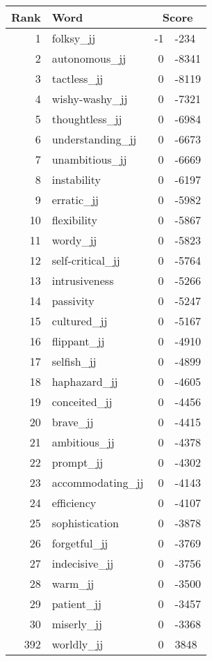 \begin{longtable}[!htbp]{| rlr@{.}l |}
    \hline
    \textbf{Rank} & \textbf{Word} & \multicolumn{2}{c|}{\textbf{Score}} \\
    \hline
    \endhead
    1 & folksy\_jj & -1 & -234 \\
    2 & autonomous\_jj & 0 & -8341 \\
    3 & tactless\_jj & 0 & -8119 \\
    4 & wishy-washy\_jj & 0 & -7321 \\
    5 & thoughtless\_jj & 0 & -6984 \\
    6 & understanding\_jj & 0 & -6673 \\
    7 & unambitious\_jj & 0 & -6669 \\
    8 & instability & 0 & -6197 \\
    9 & erratic\_jj & 0 & -5982 \\
    10 & flexibility & 0 & -5867 \\
    11 & wordy\_jj & 0 & -5823 \\
    12 & self-critical\_jj & 0 & -5764 \\
    13 & intrusiveness & 0 & -5266 \\
    14 & passivity & 0 & -5247 \\
    15 & cultured\_jj & 0 & -5167 \\
    16 & flippant\_jj & 0 & -4910 \\
    17 & selfish\_jj & 0 & -4899 \\
    18 & haphazard\_jj & 0 & -4605 \\
    19 & conceited\_jj & 0 & -4456 \\
    20 & brave\_jj & 0 & -4415 \\
    21 & ambitious\_jj & 0 & -4378 \\
    22 & prompt\_jj & 0 & -4302 \\
    23 & accommodating\_jj & 0 & -4143 \\
    24 & efficiency & 0 & -4107 \\
    25 & sophistication & 0 & -3878 \\
    26 & forgetful\_jj & 0 & -3769 \\
    27 & indecisive\_jj & 0 & -3756 \\
    28 & warm\_jj & 0 & -3500 \\
    29 & patient\_jj & 0 & -3457 \\
    30 & miserly\_jj & 0 & -3368 \\
    392 & worldly\_jj & 0 & 3848 \\

\end{longtable}
